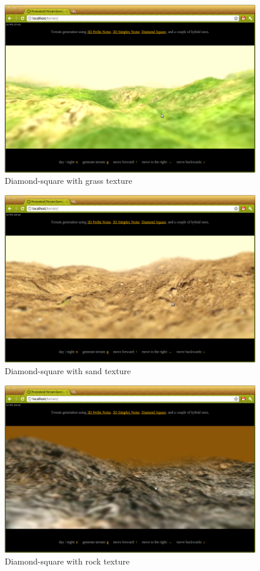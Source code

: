 \begin{figure}
	\center
	\includegraphics[scale=0.4]{demo_1_1.png}
	\caption{Diamond-square with grass texture}
	\label{fig:demo_1_1}
\end{figure}
\begin{figure}
	\center
	\includegraphics[scale=0.4]{demo_1_2.png}
	\caption{Diamond-square with sand texture}
	\label{fig:demo_1_2}
\end{figure}
\begin{figure}
	\center
	\includegraphics[scale=0.4]{demo_1_3.png}
	\caption{Diamond-square with rock texture}
	\label{fig:demo_1_3}
\end{figure}
